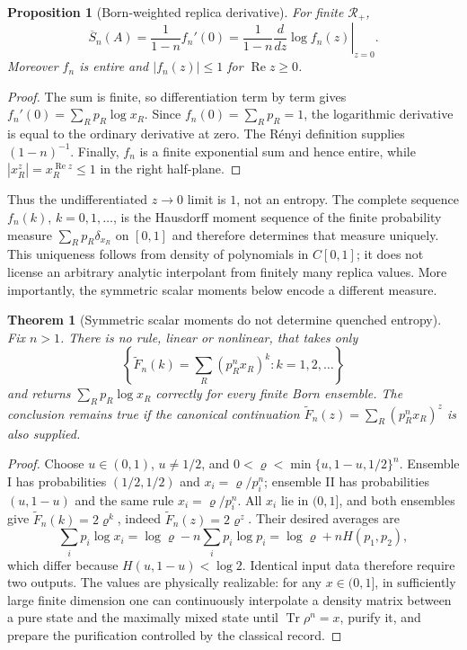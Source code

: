 \documentclass[aps,prx,reprint,superscriptaddress,nobibnotes,longbibliography]{revtex4-2}
\newtheorem{theorem}{Theorem}
\newtheorem{proposition}{Proposition}
\theoremstyle{remark}
\newcommand{\Tr}{\operatorname{Tr}}
\begin{document}
\begin{proposition}[Born-weighted replica derivative]
\label{prop:replica-derivative}
For finite $\mathcal R_+$,
\begin{equation}
 \overline S_n(A)=\frac1{1-n}f_n'(0)
 =\frac1{1-n}\left.\frac{d}{dz}\log f_n(z)\right|_{z=0}.
 \label{eq:replicaderiv}
\end{equation}
Moreover $f_n$ is entire and $|f_n(z)|\le1$ for $\operatorname{Re}z\ge0$.
\end{proposition}

\begin{proof}
The sum is finite, so differentiation term by term gives
$f_n'(0)=\sum_Rp_R\log x_R$.  Since $f_n(0)=\sum_Rp_R=1$, the logarithmic derivative is equal to the ordinary derivative at zero.  The R\'enyi definition supplies $(1-n)^{-1}$.  Finally, $f_n$ is a finite exponential sum and hence entire, while $|x_R^z|=x_R^{\operatorname{Re}z}\le1$ in the right half-plane.
\end{proof}

Thus the undifferentiated $z\to0$ limit is $1$, not an entropy.  The complete sequence $f_n(k)$, $k=0,1,\ldots$, is the Hausdorff moment sequence of the finite probability measure $\sum_Rp_R\delta_{x_R}$ on $[0,1]$ and therefore determines that measure uniquely.  This uniqueness follows from density of polynomials in $C[0,1]$; it does not license an arbitrary analytic interpolant from finitely many replica values.  More importantly, the symmetric scalar moments below encode a different measure.

\begin{theorem}[Symmetric scalar moments do not determine quenched entropy]
\label{thm:no-go}
Fix $n>1$.  There is no rule, linear or nonlinear, that takes only
\begin{equation}
 \left\{\widetilde F_n(k)=\sum_R(p_R^nx_R)^k:k=1,2,\ldots\right\}
 \label{eq:symmdata}
\end{equation}
and returns $\sum_Rp_R\log x_R$ correctly for every finite Born ensemble.  The conclusion remains true if the canonical continuation
$\widetilde F_n(z)=\sum_R(p_R^nx_R)^z$ is also supplied.
\end{theorem}

\begin{proof}
Choose $u\in(0,1)$, $u\ne1/2$, and
$0<\varrho<\min\{u,1-u,1/2\}^n$.  Ensemble I has probabilities $(1/2,1/2)$ and $x_i=\varrho/p_i^n$; ensemble II has probabilities $(u,1-u)$ and the same rule $x_i=\varrho/p_i^n$.  All $x_i$ lie in $(0,1]$, and both ensembles give
$\widetilde F_n(k)=2\varrho^k$, indeed $\widetilde F_n(z)=2\varrho^z$.  Their desired averages are
\begin{equation}
 \sum_i p_i\log x_i=\log\varrho-n\sum_i p_i\log p_i
 =\log\varrho+nH(p_1,p_2),
\end{equation}
which differ because $H(u,1-u)<\log2$.  Identical input data therefore require two outputs.  The values are physically realizable: for any $x\in(0,1]$, in sufficiently large finite dimension one can continuously interpolate a density matrix between a pure state and the maximally mixed state until $\Tr\rho^n=x$, purify it, and prepare the purification controlled by the classical record.
\end{proof}
\end{document}
